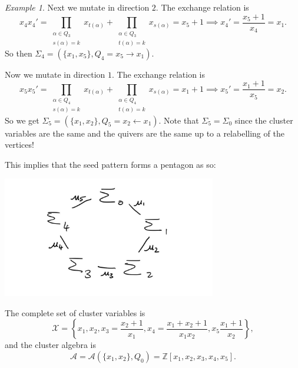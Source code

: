 \documentclass[12pt]{amsart}
\theoremstyle{remark}
\theoremstyle{remark}
\newtheorem*{example}{Example}
\begin{document}
\begin{example}
Next we mutate in direction $2$.
The exchange relation is 
$$ 
x_4 x_4' =  \prod_{\substack{\alpha \in Q_3 \\ s(\alpha) = k}} x_{t(\alpha)} + \prod_{\substack{\alpha \in Q_3 \\ t(\alpha) = k}} x_{s(\alpha)} = x_5 + 1
\implies x_4' = \frac{x_5 + 1}{x_4} = x_1.
$$
So then $\Sigma_4 = (\{x_1, x_5\}, Q_4 = x_5 \to x_1)$.

Now we mutate in direction $1$.
The exchange relation is
$$ 
x_5 x_5' =  \prod_{\substack{\alpha \in Q_4 \\ s(\alpha) = k}} x_{t(\alpha)} + \prod_{\substack{\alpha \in Q_4 \\ t(\alpha) = k}} x_{s(\alpha)} = x_1 + 1
\implies x_5' = \frac{x_1 + 1}{x_5} = x_2.
$$
So we get $\Sigma_5 = (\{x_1, x_2\}, Q_5 = x_2 \leftarrow x_1)$.
Note that $\Sigma_5 = \Sigma_0$ since the cluster variables are the same and the quivers are the same up to a relabelling of the vertices!

This implies that the seed pattern forms a pentagon as so:

\centerline{\includegraphics[width=0.7\textwidth]{closed_pattern}}

The complete set of cluster variables is
$$\mathcal{X} = \left\{x_1, x_2, x_3 = \frac{x_2 + 1}{x_1}, x_4 = \frac{x_1 + x_2 + 1}{x_1 x_2}, x_5 \frac{x_1 + 1}{x_2}\right\},$$
and the cluster algebra is
$$\mathcal{A} = \mathcal{A}(\{x_1, x_2\}, Q_0) = \mathbb{Z}\left[x_1, x_2, x_3, x_4, x_5\right].$$
\end{example}
\end{document}
